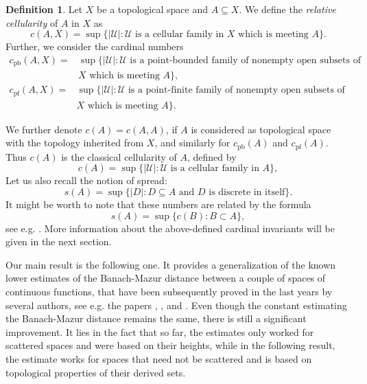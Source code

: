 \documentclass{amsart}
\numberwithin{equation}{section}
\theoremstyle{definition}
\newtheorem{definition}[thm]{Definition}
\newcommand{\abs}[1]{\left| #1  \right|}
\begin{document}
\begin{definition}
Let $X$ be a topological space and $A \subseteq X$. We define the \emph{relative cellularity} of $A$ in $X$ as
\[c(A, X)=\sup \{ \abs{\mathcal{U}}: \mathcal{U} \text{ is a cellular family in } X \text{ which is meeting } A\}.\]
Further, we consider the cardinal numbers
\begin{equation}
\nonumber
\begin{aligned}
c_{\text{pb}}(A, X)=&\sup \{ \abs{\mathcal{U}}: \mathcal{U} \text{ is a point-bounded} \text{ family of nonempty open subsets of } \\&X \text{ which is meeting } A\},
\end{aligned}
\end{equation}
\begin{equation}
\nonumber
\begin{aligned}
c_{\text{pf}}(A, X)=&\sup \{ \abs{\mathcal{U}}: \mathcal{U} \text{ is a point-finite} \text{ family of nonempty open subsets of } \\&X \text{ which is meeting } A\}.
\end{aligned}
\end{equation}
\end{definition}

We further denote $c(A)=c(A, A)$, if $A$ is considered as topological space with the topology inherited from $X$, and similarly for $c_{\text{pb}}(A)$ and $c_{\text{pf}}(A)$. Thus $c(A)$ is the classical cellularity of $A$, defined by
\[c(A)=\sup \{ \abs{\mathcal{U}}: \mathcal{U} \text{ is a cellular family in } A \},\]
Let us also recall the notion of spread:
\[s(A)=\sup \{ \abs{D}: D \subseteq A \text{ and } D \text{ is discrete in itself} \}.\]
It might be worth to note that these numbers are related by the formula
\[s(A)=\sup \{c(B): B \subset A\},\]
see e.g. \cite[page 37]{Arkhangelskii_cardinal_invariants}.
More information about the above-defined cardinal invariants will be given in the next section. 

Our main result is the following one. It provides a generalization of the known lower estimates of the Banach-Mazur distance between a couple of spaces of continuous functions, that have been subsequently proved in the last years by several authors, see e.g. the papers \cite{CandidoGalegoComega}, \cite{CANDIDOc0}, \cite{rondos-scattered-subspaces} and \cite{rondos-somaglia}. Even though the constant estimating the Banach-Mazur distance remains the same, there is still a significant improvement. It lies in the fact that so far, the estimates only worked for scattered spaces and were based on their heights, while in the following result, the estimate works for spaces that need not be scattered and is based on topological properties of their derived sets.  
\end{document}
